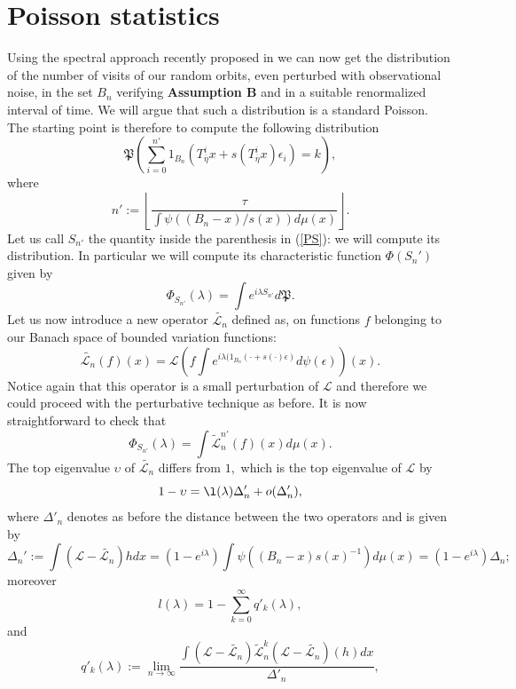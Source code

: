 \documentclass{article}
\newcommand{\1}{\mathbbm{1}}
\begin{document}
             \section{Poisson statistics}\label{PPSS}
Using the spectral approach recently proposed in \cite{AFGV} we can now get the distribution of the number of visits of our random orbits, even perturbed with observational noise, in the set $B_n$ verifying {\bf Assumption B}  and in a suitable renormalized interval of time. We will argue  that such a distribution is a standard Poisson.\\
The starting point is therefore  to compute the following distribution
\begin{equation}\label{PS}
\mathfrak{P}\left(\sum_{i=0}^{n'}1_{B_n}(T_{\overline{\eta}}^i x+s(T_{\overline{\eta}}^i x)\epsilon_i)=k\right),
\end{equation}
where  
\begin{equation}\label{rez}
n':=\left\lfloor{\frac{\tau}{\int \psi((B_n-x)/s(x))d\mu(x)}}\right\rfloor.
\end{equation}
Let us call $S_{n'}$ the quantity inside the parenthesis in (\ref{PS}): we will compute its distribution.
In particular 
we will compute its characteristic function $\Phi(S_n')$ given by
$$
\Phi_{S_{n'}}(\lambda)=\int e^{i\lambda S_{n'}}d\mathfrak{P}.
$$
Let us now introduce a new operator $\tilde{\mathcal{L}_n}$ defined as, on functions $f$ belonging to our Banach space of bounded variation functions:
$$
\tilde{\mathcal{L}_n}(f)(x)=\mathcal{L}(f \int e^{i\lambda(1_{B_n}(\cdot+s(\cdot)\epsilon)}d\psi(\epsilon))(x).
$$
Notice again that this operator is a small perturbation of $\mathcal{L}$ and therefore we could proceed with the perturbative technique as before. It is now straightforward to check that
$$
\Phi_{S_{n'}}(\lambda)=\int \tilde{\mathcal{L}}_n^{n'}(f)(x) d\mu(x).
$$
The top eigenvalue $\upsilon$ of $\tilde{\mathcal{L}_n}$ differs from $1,$ which is the top eigenvalue of $\mathcal{L}$ by
$$
1-\upsilon= \l(\lambda)\Delta'_n+o(\Delta_n'),
$$
where $\Delta'_n$ denotes as before the distance between the two operators and is given by
$$
\Delta_n':=\int (\mathcal{L}-\tilde{\mathcal{L}_n})hdx=(1-e^{i\lambda})\int \psi((B_n-x)s(x)^{-1})d\mu(x)=(1-e^{i\lambda})\Delta_n;
$$
moreover 
$$
l(\lambda)=1-\sum_{k=0}^{\infty}q'_k(\lambda),
$$
and 
$$
q'_k(\lambda):=\lim_{n\rightarrow \infty}\frac{\int(\mathcal{L}-\tilde{\mathcal{L}_n}) \tilde{\mathcal{L}}_n^k(\mathcal{L}-\tilde{\mathcal{L}_n})(h)dx}{\Delta'_n},
$$
\end{document}
